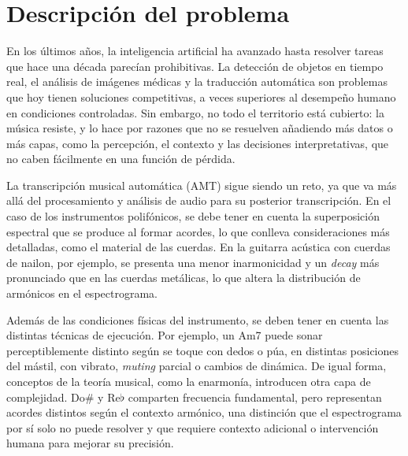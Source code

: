 \section{Descripción del problema}

En los últimos años, la inteligencia artificial ha avanzado hasta resolver tareas que hace una década parecían prohibitivas. La detección de objetos en tiempo real, el análisis de imágenes médicas y la traducción automática son problemas que hoy tienen soluciones competitivas, a veces superiores al desempeño humano en condiciones controladas. Sin embargo, no todo el territorio está cubierto: la música resiste, y lo hace por razones que no se resuelven añadiendo más datos o más capas, como la percepción, el contexto y las decisiones interpretativas, que no caben fácilmente en una función de pérdida.

La transcripción musical automática (AMT) sigue siendo un reto, ya que va más allá del procesamiento y análisis de audio para su posterior transcripción. En el caso de los instrumentos polifónicos, se debe tener en cuenta la superposición espectral que se produce al formar acordes, lo que conlleva consideraciones más detalladas, como el material de las cuerdas. En la guitarra acústica con cuerdas de nailon, por ejemplo, se presenta una menor inarmonicidad y un \textit{decay} más pronunciado que en las cuerdas metálicas, lo que altera la distribución de armónicos en el espectrograma.

Además de las condiciones físicas del instrumento, se deben tener en cuenta las distintas técnicas de ejecución. Por ejemplo, un Am7 puede sonar perceptiblemente distinto según se toque con dedos o púa, en distintas posiciones del mástil, con vibrato, \textit{muting} parcial o cambios de dinámica. De igual forma, conceptos de la teoría musical, como la enarmonía, introducen otra capa de complejidad. Do\# y Re$\flat$ comparten frecuencia fundamental, pero representan acordes distintos según el contexto armónico, una distinción que el espectrograma por sí solo no puede resolver y que requiere contexto adicional o intervención humana para mejorar su precisión.
